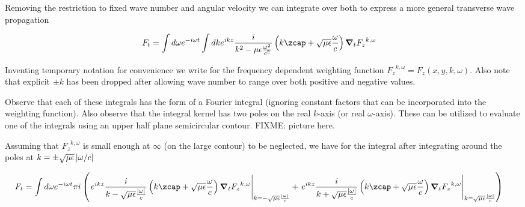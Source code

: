 Removing the restriction to fixed wave number and angular velocity we can integrate over both to express a more general transverse wave propagation

\begin{align}\label{eqn:waveguideRetardedAdvanced:foo8}
F_t &= \int d\omega e^{-i\omega t} \int dk e^{ikz} \frac{i}{k^2 - \mu\epsilon\frac{\omega^2}{c^2}} \left(k \zcap + \sqrt{\mu\epsilon}\frac{\omega}{c}\right) \spacegrad_t {F_z}^{k,\omega}
\end{align}

Inventing temporary notation for convenience we write for the frequency dependent weighting function ${F_z}^{k,\omega} = F_z(x,y,k,\omega)$.  Also note that explicit $\pm k$ has been dropped after allowing wave number to range over both positive and negative values.

Observe that each of these integrals has the form of a Fourier integral (ignoring constant factors that can be incorporated into the weighting function).  Also observe that the integral kernel has two poles on the real $k$-axis (or real $\omega$-axis).  These can be utilized to evaluate one of the integrals using an upper half plane semicircular contour.  FIXME: picture here.

Assuming that ${F_z}^{k,\omega}$ is small enough at $\infty$ (on the large contour) to be neglected, we have for the integral after integrating around the poles at $k = \pm \sqrt{\mu\epsilon}\left\lvert{\omega/c}\right\rvert$

\begin{align}\label{eqn:waveguideRetardedAdvanced:foo9}
F_t &= \int d\omega e^{-i\omega t} 
\pi i \left(
\left.
e^{ikz} \frac{i}{k - \sqrt{\mu\epsilon}\frac{\Abs{\omega}}{c}} \left(k \zcap + \sqrt{\mu\epsilon}\frac{\omega}{c}\right) \spacegrad_t {F_z}^{k,\omega}
\right\vert_{k=-\sqrt{\mu\epsilon}\frac{\Abs{\omega}}{c}}
+\left.
e^{ikz} \frac{i}{k + \sqrt{\mu\epsilon}\frac{\Abs{\omega}}{c}} \left(k \zcap + \sqrt{\mu\epsilon}\frac{\omega}{c}\right) \spacegrad_t {F_z}^{k,\omega}
\right\vert_{k=\sqrt{\mu\epsilon}\frac{\Abs{\omega}}{c}}
\right)
\end{align}

\EndArticle

